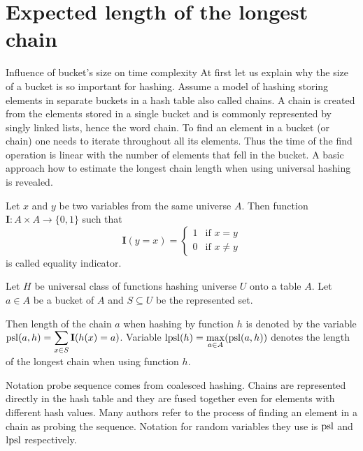\chapter{Expected length of the longest chain}

\begin{section}{Influence of bucket's size on time complexity}
At first let us explain why the size of a bucket is so important for hashing. Assume a model of hashing storing elements in separate buckets in a hash table also called chains. A chain is created from the elements stored in a single bucket and is commonly represented by singly linked lists, hence the word chain. To find an element in a bucket (or chain) one needs to iterate throughout all its elements. Thus the time of the find operation is linear with the number of elements that fell in the bucket. A basic approach how to estimate the longest chain length when using universal hashing is revealed.

\begin{definition}
Let $x$ and $y$ be two variables from the same universe $A$. Then function $\mathbf{I}: A \times A \rightarrow \{0, 1\}$ such that
\[
 \mathbf{I}(y = x) =
  \begin{cases}
   1 & \text{if } x = y \\
   0 & \text{if } x \neq y
  \end{cases}
\]
is called equality indicator.
\end{definition}

\begin{definition}
Let $H$ be universal class of functions hashing universe $U$ onto a table $A$. Let $a \in A$ be a bucket of $A$ and $S \subseteq U$ be the represented set. 

Then length of the chain $a$ when hashing by function $h$ is denoted by the variable $\mathrm{psl}(a, h) = \displaystyle \sum_{x \in S} \mathbf{I}(h(x) = a)$. Variable $\mathrm{lpsl}(h) = \displaystyle \max_{a \in A} (\mathrm{psl}(a, h))$ denotes the length of the longest chain when using function $h$.
\end{definition}

Notation probe sequence comes from coalesced hashing. Chains are represented directly in the hash table and they are fused together even for elements with different hash values. Many authors refer to the process of finding an element in a chain as probing the sequence. Notation for random variables they use is $\mathrm{psl}$ and $\mathrm{lpsl}$ respectively. %


\end{section}
